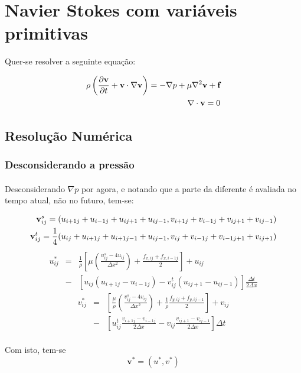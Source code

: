 \documentclass[poisson.tex]{subfiles}
\begin{document}
\section{Navier Stokes com variáveis primitivas}
Quer-se resolver a seguinte equação:

\begin{eqnarray}
\NavierStokesEq{\textbf{v}}{\textbf{f}}{navierstokes}\\
\NScondition{\textbf{v}}
\end{eqnarray}

\subsection{Resolução Numérica}
\subsubsection{Desconsiderando a pressão}
\paragraph{} Desconsiderando $\nabla p$ por agora, e notando que a parte da diferente é avaliada no tempo atual, não no futuro, tem-se:

\begin{eqnarray}
\textbf{v}_{ij}^s=({u}_{i+1j}+{u}_{i-1j}+{u}_{ij+1}+{u}_{ij-1},{v}_{i+1j}+{v}_{i-1j}+{v}_{ij+1}+{v}_{ij-1})\\
\textbf{v}_{ij}^t=\frac{1}{4}(u_{ij}+u_{i+1j}+u_{i+1j-1}+u_{ij-1},v_{ij}+v_{i-1j}+v_{i-1j+1}+v_{ij+1})
\end{eqnarray}
\begin{eqnarray}
u_{ij}^{*}&=&\frac{1}{\rho}\left[\mu\left(\frac{u_{ij}^s-4u_{ij}}{\Delta
x^2}\right)+\frac{f_{x,ij}+f_{x,i-1j}}{2}\right] + u_{ij}\nonumber \\
&-&\left[u_{ij}(u_{i+1j}-u_{i-1j})-v_{ij}^t(u_{ij+1}-u_{ij-1})\right]\frac{\Delta t}{2\Delta x}
\end{eqnarray}
\begin{eqnarray}
v_{ij}^{*}&=&\left[\frac{\mu}{\rho}\left(\frac{v_{ij}^s-4v_{ij}}{\Delta
x^2}\right)+\frac{1}{\rho}\frac{f_{y,ij}+f_{y,ij-1}}{2}\right] + v_{ij}\nonumber \\
&-&\left[u_{ij}^t\frac{v_{i+1j}-v_{i-1j}}{2\Delta
x}-v_{ij}\frac{v_{ij+1}-v_{ij-1}}{2\Delta x}\right]\Delta t
\end{eqnarray}

\paragraph{} Com isto, tem-se \[\textbf{v}^{*}=(u^*,v^*)\]
\end{document}
